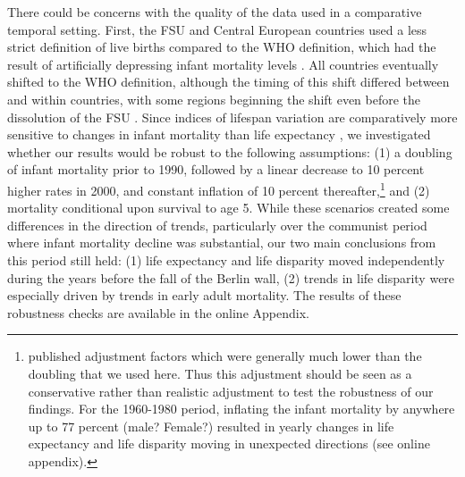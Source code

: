 \documentclass{article}
\begin{document}
\begin{spacing}{1.5}
\textcolor[rgb]{0,0.58,0}{There could be concerns with the quality of the data used in a comparative temporal setting. First, the FSU and Central European countries used a less strict definition of live births compared to the WHO definition, which had the result of artificially depressing infant mortality levels \citep{aleshina2005,unicef2003social}. All countries eventually shifted to the WHO definition, although the timing of this shift differed between and within countries, with some regions beginning the shift even before the dissolution of the FSU \citep{anderson1986infant, aleshina2005, unicef2003social}. Since indices of lifespan variation are comparatively more sensitive to changes in infant mortality than life expectancy \citep{vanraalte2013}, we investigated whether our results would be robust to the following assumptions: (1) a doubling of infant mortality prior to 1990, followed by a linear decrease to 10 percent higher rates in 2000, and constant inflation of 10 percent thereafter,\footnote{\citet{kingkade2001infant} published adjustment factors which were generally much lower than the doubling that we used here. Thus this adjustment should be seen as a conservative rather than realistic adjustment to test the robustness of our findings. For the 1960-1980 period, inflating the infant mortality by anywhere up to 77 percent \textcolor[rgb]{1,0,0}{(male? Female?) }resulted in yearly changes in life expectancy and life disparity moving in unexpected directions (see online appendix).} and (2) mortality conditional upon survival to age 5. While these scenarios created some differences in the direction of trends, particularly over the communist period where infant mortality decline was substantial, our two main conclusions from this period still held: (1) life expectancy and life disparity moved independently during the years before the fall of the Berlin wall, (2) trends in life disparity were especially driven by trends in early adult mortality. The results of these robustness checks are available in the online Appendix. }\\


\end{spacing}
\end{document}
